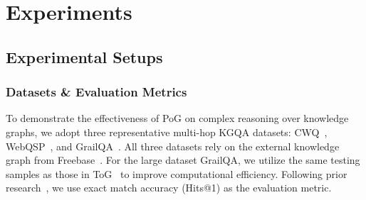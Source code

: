 \documentclass{article}
\begin{document}


\vspace{-2mm}
\section{Experiments}
\label{experiment}
\vspace{-2mm}
\subsection{Experimental Setups}
\label{setup}
\vspace{-1mm}
\subsubsection{Datasets \& Evaluation Metrics}
\vspace{-2mm}
To demonstrate the effectiveness of PoG on complex reasoning over knowledge graphs, we adopt three representative multi-hop KGQA datasets: CWQ~\cite{talmor2018web}, WebQSP~\cite{yih2016value}, and GrailQA~\cite{gu2021beyond}.
All three datasets rely on the external knowledge graph from Freebase~\cite{bollacker2008freebase}.
For the large dataset GrailQA, we utilize the same testing samples as those in ToG~\cite{sun2024think} to improve computational efficiency.
Following prior research~\cite{li2023few, jiang2023structgpt, sun2024think}, we use exact match accuracy (Hits@1) as the evaluation metric.
\end{document}
